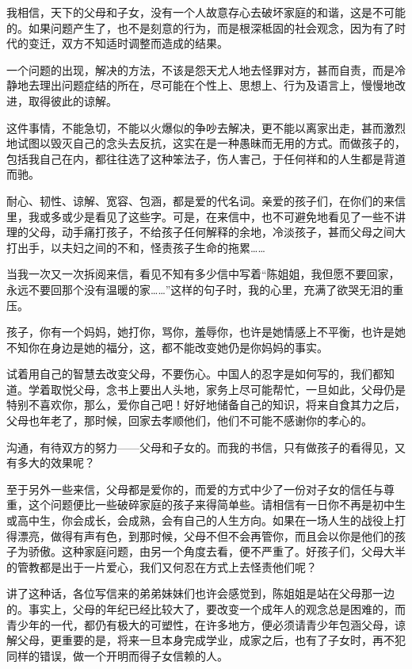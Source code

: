 \par 我相信，天下的父母和子女，没有一个人故意存心去破坏家庭的和谐，这是不可能的。如果问题产生了，也不是刻意的行为，而是根深柢固的社会观念，因为有了时代的变迁，双方不知适时调整而造成的结果。
\par 一个问题的出现，解决的方法，不该是怨天尤人地去怪罪对方，甚而自责，而是冷静地去理出问题症结的所在，尽可能在个性上、思想上、行为及语言上，慢慢地改进，取得彼此的谅解。
\par 这件事情，不能急切，不能以火爆似的争吵去解决，更不能以离家出走，甚而激烈地试图以毁灭自己的念头去反抗，这实在是一种愚昧而无用的方式。而做孩子的，包括我自己在内，都往往选了这种笨法子，伤人害己，于任何祥和的人生都是背道而驰。
\par 耐心、韧性、谅解、宽容、包涵，都是爱的代名词。亲爱的孩子们，在你们的来信里，我或多或少是看见了这些字。可是，在来信中，也不可避免地看见了一些不讲理的父母，动手痛打孩子，不给孩子任何解释的余地，冷淡孩子，甚而父母之间大打出手，以夫妇之间的不和，怪责孩子生命的拖累……
\par 当我一次又一次拆阅来信，看见不知有多少信中写着“陈姐姐，我但愿不要回家，永远不要回那个没有温暖的家……”这样的句子时，我的心里，充满了欲哭无泪的重压。
\par 孩子，你有一个妈妈，她打你，骂你，羞辱你，也许是她情感上不平衡，也许是她不知你在身边是她的福分，这，都不能改变她仍是你妈妈的事实。
\par 试着用自己的智慧去改变父母，不要伤心。中国人的忍字是如何写的，我们都知道。学着取悦父母，念书上要出人头地，家务上尽可能帮忙，一旦如此，父母仍是特别不喜欢你，那么，爱你自己吧！好好地储备自己的知识，将来自食其力之后，父母也年老了，那时候，回家去孝顺他们，他们不可能不感谢你的孝心的。
\par 沟通，有待双方的努力——父母和子女的。而我的书信，只有做孩子的看得见，又有多大的效果呢？
\par 至于另外一些来信，父母都是爱你的，而爱的方式中少了一份对子女的信任与尊重，这个问题便比一些破碎家庭的孩子来得简单些。请相信有一日你不再是初中生或高中生，你会成长，会成熟，会有自己的人生方向。如果在一场人生的战役上打得漂亮，做得有声有色，到那时候，父母不但不会再管你，而且会以你是他们的孩子为骄傲。这种家庭问题，由另一个角度去看，便不严重了。好孩子们，父母大半的管教都是出于一片爱心，我们又何忍在方式上去怪责他们呢？
\par 讲了这种话，各位写信来的弟弟妹妹们也许会感觉到，陈姐姐是站在父母那一边的。事实上，父母的年纪已经比较大了，要改变一个成年人的观念总是困难的，而青少年的一代，都仍有极大的可塑性，在许多地方，便必须请青少年包涵父母，谅解父母，更重要的是，将来一旦本身完成学业，成家之后，也有了子女时，再不犯同样的错误，做一个开明而得子女信赖的人。
